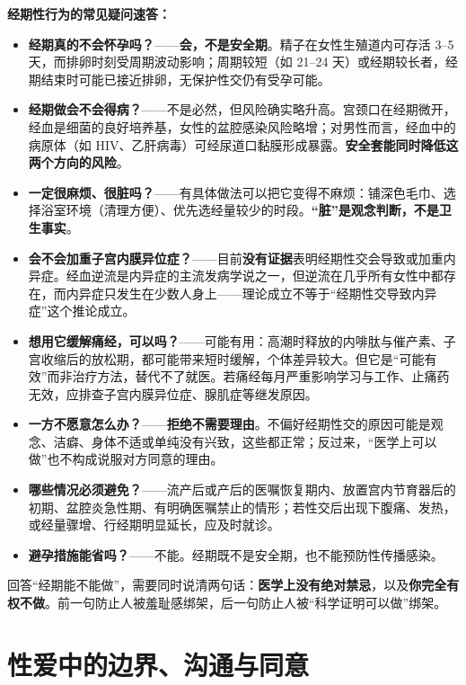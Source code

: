 \documentclass[12pt,UTF8]{ctexbook}
\begin{document}
\textbf{经期性行为的常见疑问速答：}
\begin{itemize}
	\item \textbf{经期真的不会怀孕吗？}——\textbf{会，不是安全期}。精子在女性生殖道内可存活 3--5 天，而排卵时刻受周期波动影响；周期较短（如 21--24 天）或经期较长者，经期结束时可能已接近排卵，无保护性交仍有受孕可能。
	\item \textbf{经期做会不会得病？}——不是必然，但风险确实略升高。宫颈口在经期微开，经血是细菌的良好培养基，女性的盆腔感染风险略增；对男性而言，经血中的病原体（如 HIV、乙肝病毒）可经尿道口黏膜形成暴露。\textbf{安全套能同时降低这两个方向的风险}。
	\item \textbf{一定很麻烦、很脏吗？}——有具体做法可以把它变得不麻烦：铺深色毛巾、选择浴室环境（清理方便）、优先选经量较少的时段。\textbf{“脏”是观念判断，不是卫生事实}。
	\item \textbf{会不会加重子宫内膜异位症？}——目前\textbf{没有证据}表明经期性交会导致或加重内异症。经血逆流是内异症的主流发病学说之一，但逆流在几乎所有女性中都存在，而内异症只发生在少数人身上——理论成立不等于“经期性交导致内异症”这个推论成立。
	\item \textbf{想用它缓解痛经，可以吗？}——可能有用：高潮时释放的内啡肽与催产素、子宫收缩后的放松期，都可能带来短时缓解，个体差异较大。但它是“可能有效”而非治疗方法，替代不了就医。若痛经每月严重影响学习与工作、止痛药无效，应排查子宫内膜异位症、腺肌症等继发原因。
	\item \textbf{一方不愿意怎么办？}——\textbf{拒绝不需要理由}。不偏好经期性交的原因可能是观念、洁癖、身体不适或单纯没有兴致，这些都正常；反过来，“医学上可以做”也不构成说服对方同意的理由。
	\item \textbf{哪些情况必须避免？}——流产后或产后的医嘱恢复期内、放置宫内节育器后的初期、盆腔炎急性期、有明确医嘱禁止的情形；若性交后出现下腹痛、发热，或经量骤增、行经期明显延长，应及时就诊。
	\item \textbf{避孕措施能省吗？}——不能。经期既不是安全期，也不能预防性传播感染。
\end{itemize}

\begin{tcolorbox}[colback=pink!5!white,colframe=red!50!black,title=贴心小叮咛]
	回答“经期能不能做”，需要同时说清两句话：\textbf{医学上没有绝对禁忌}，以及\textbf{你完全有权不做}。前一句防止人被羞耻感绑架，后一句防止人被“科学证明可以做”绑架。
\end{tcolorbox}


\chapter{性爱中的边界、沟通与同意}
\end{document}
